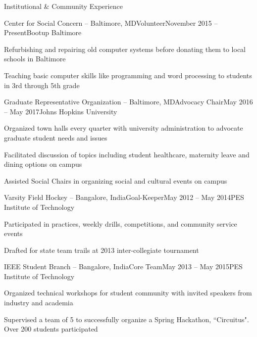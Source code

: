 \documentclass{resume}
\begin{document}
\vspace{1em}

  \begin{rSection}{Institutional \& Community Experience}
\begin{rSubsection}{Center for Social Concern -- Baltimore, MD}{}{Volunteer}{November 2015 -- Present}{Bootup Baltimore}
\item Refurbishing and repairing old computer systems before donating them to local schools in Baltimore
\item Teaching basic computer skills like programming and word processing to students in 3rd through 5th grade 
    \end{rSubsection}
          \begin{rSubsection}{Graduate Representative Organization -- Baltimore, MD}{}{Advocacy Chair}{May 2016 -- May 2017}{Johns Hopkins University}
\item Organized town halls every quarter with university administration to advocate graduate student needs and issues
\item Facilitated discussion of topics including student healthcare, maternity leave and dining options on campus
\item Assisted Social Chairs in organizing social and cultural events on campus
    \end{rSubsection}
\begin{rSubsection}{Varsity Field Hockey -- Bangalore, India}{}{Goal-Keeper}{May 2012 -- May 2014}{PES Institute of Technology}
\item Participated in practices, weekly drills, competitions, and community service events
\item Drafted for state team trails at 2013 inter-collegiate tournament 
    \end{rSubsection}

\begin{rSubsection}{IEEE Student Branch -- Bangalore, India}{}{Core Team}{May 2013 -- May 2015}{PES Institute of Technology}
\item Organized technical workshops for student community with invited speakers from industry and academia
\item Supervised a team of 5 to successfully organize a Spring Hackathon, ``Circuitus". Over 200 students participated
    \end{rSubsection}
  \end{rSection}   

\vspace{1em}
\end{document}
